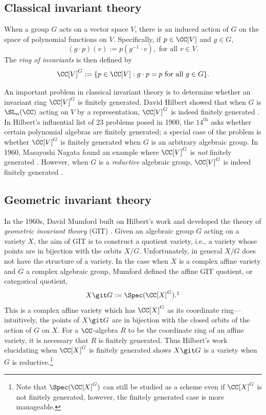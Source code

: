\documentclass[12pt]{amsart}
\theoremstyle{plain}
\begin{document}
\subsection{Classical invariant theory}
When a group $G$ acts on a vector space $V$, there is an induced action of $G$ on the space of polynomial functions on $V$.
Specifically, if $p \in \CC[V]$ and $g \in G$,
$$(g \cdot p)(v) := p(g^{-1} \cdot v), \text{ for all } v \in V.$$
The \emph{ring of invariants} is then defined by
$$\CC[V]^G := \{p \in \CC[V] : g \cdot p = p \text{ for all } g \in G\}.$$

An important problem in classical invariant theory is to determine whether an invariant ring $\CC[V]^G$ is finitely generated.
David Hilbert showed that when $G$ is $\SL_n(\CC)$ acting on $V$ by a representation, $\CC[V]^G$ is indeed finitely generated \cite{Hilbert90}.
In Hilbert's influential list of 23 problems posed in 1900, the $14^\text{th}$ asks whether certain polynomial algebras are finitely generated;
a special case of the problem is whether $\CC[V]^G$ is finitely generated when $G$ is an arbitrary algebraic group.
In 1960, Masayoshi Nagata found an example where $\CC[V]^G$ is \emph{not} finitely generated \cite{Nagata60}.
However, when $G$ is a \emph{reductive} algebraic group, $\CC[V]^G$ is indeed finitely generated \cite[Theorem 4.51]{Mukai03}.

\subsection{Geometric invariant theory}
In the 1960s, David Mumford built on Hilbert's work and developed the theory of \emph{geometric invariant theory} (GIT) \cite{Mumford65}.
Given an algebraic group $G$ acting on a variety $X$, the aim of GIT is to construct a quotient variety, i.e., a variety whose points are in bijection with the orbits $X/G$.
Unfortunately, in general $X/G$ does not have the structure of a variety.
In the case when $X$ is a complex affine variety and $G$ a complex algebraic group, Mumford defined the affine GIT quotient, or categorical quotient,
$$X \git G := \Spec(\CC[X]^G).\footnote{In this work, $\Spec$ denotes the maximal spectrum instead of the prime spectrum, i.e., we consider affine varieties instead of affine schemes. See \S \ref{varietiessection} for further discussion of our definition of a variety.}$$
This is a complex affine variety which has $\CC[X]^G$ as its coordinate ring---intuitively, the points of $X \git G$ are in bijection with the closed orbits of the action of $G$ on $X$.
For a $\CC$-algebra $R$ to be the coordinate ring of an affine variety, it is necessary that $R$ is finitely generated.
Thus Hilbert's work elucidating when $\CC[X]^G$ is finitely generated shows $X \git G$ is a variety when $G$ is reductive.\footnote{Note that $\Spec(\CC[X]^G)$ can still be studied as a scheme even if $\CC[X]^G$ is not finitely generated, however, the finitely generated case is more manageable.}
\end{document}

